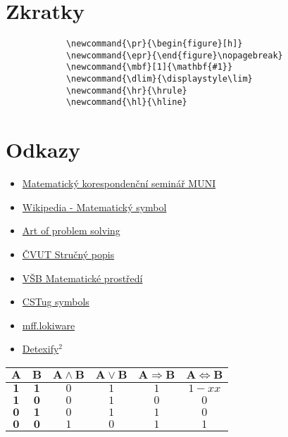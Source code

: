 \documentclass{article}
\newcommand{\hl}{\hline}
\newcommand{\dlim}{\displaystyle\lim}
\newcommand{\mbf}[1]{\mathbf{#1}}
\begin{document}
\begin{multicols}{2}
	\columnbreak

		\section*{Zkratky}
		\begin{verbatim}
			\newcommand{\pr}{\begin{figure}[h]}
			\newcommand{\epr}{\end{figure}\nopagebreak}
			\newcommand{\mbf}[1]{\mathbf{#1}}
			\newcommand{\dlim}{\displaystyle\lim}
			\newcommand{\hr}{\hrule}
			\newcommand{\hl}{\hline}
		\end{verbatim}

		\section*{Odkazy}
		\begin{itemize}
			\item \href{http://mks.mff.cuni.cz/info/tex/psani.php}{Matematický korespondenční seminář MUNI}
			\item \href{http://cs.wikipedia.org/wiki/Matematický_symbol}{Wikipedia - Matematický symbol}
			\item \href{http://www.artofproblemsolving.com/Wiki/index.php/LaTeX:Symbols}{Art of problem solving}
			\item \href{http://mat.fsv.cvut.cz/konickova/navody/ltxstruc.pdf}{ČVUT Stručný popis}
			\item \href{http://www.cs.vsb.cz/benes/vyuka/latex/math.htm}{VŠB Matematické prostředí}
			\item \href{http://ftp.cstug.cz/pub/tex/CTAN/info/symbols/comprehensive/symbols-letter.pdf}{CSTug symbols}
			\item \href{http://mff.lokiware.info/LaTeX}{mff.lokiware}
			\item \href{http://detexify.kirelabs.org/classify.html}{Detexify$^2$}
		\end{itemize}

		\begin{tabular}{cc|cccc}
				$\mbf{A}$	&	$\mbf{B}$	&	$\mbf{A \wedge B}$	&	$\mbf{A \vee B}$	&	$\mbf{A \Rightarrow B}$	&	$\mbf{A \Leftrightarrow B}$	\\\hline
				$\mbf{1}$	&	$\mbf{1}$	&	$0$						&	$1$					&	$1$							&	$1-x	x$								\\
				$\mbf{1}$	&	$\mbf{0}$	&	$0$						&	$1$					&	$0$							&	$0$											\\
				$\mbf{0}$	&	$\mbf{1}$	&	$0$						&	$1$					&	$1$							&	$0$											\\
				$\mbf{0}$	&	$\mbf{0}$	&	$1$						&	$0$					&	$1$							&	$1$											\\
			\end{tabular}

	\end{multicols}
\end{document}
